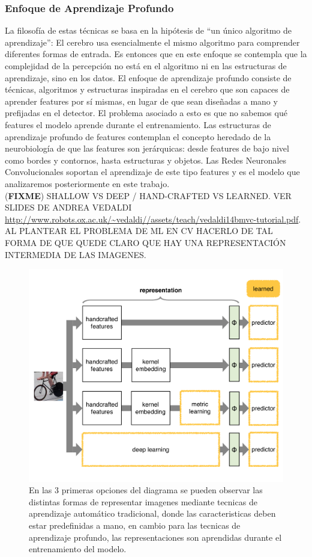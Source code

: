\documentclass[a4paper,11pt,spanish]{book}
\newcommand*{\FIXME}[1]{{(\textbf{FIXME}) {#1}}}
\begin{document}
	\subsubsection{Enfoque de Aprendizaje Profundo} 
	  La filosofía de estas técnicas se basa en la hipótesis de “un único algoritmo de aprendizaje”: El cerebro usa esencialmente el mismo algoritmo para comprender diferentes formas de entrada. 
	  Es entonces que en este enfoque se contempla que la complejidad de la percepción no está en el algoritmo ni en las estructuras de aprendizaje, sino en los datos. 
	  El enfoque de aprendizaje profundo consiste de técnicas, algoritmos y estructuras inspiradas en el cerebro que son capaces de aprender features por sí mismas, 
	  en lugar de que sean diseñadas a mano y prefijadas en el detector. El problema asociado a esto es que no sabemos qué features el modelo aprende durante el entrenamiento.
	  Las estructuras de aprendizaje profundo de features contemplan el concepto heredado de la neurobiología de que las features son jerárquicas: 
	  desde features de bajo nivel como bordes y contornos, hasta estructuras y objetos. Las Redes Neuronales Convolucionales soportan el aprendizaje de este tipo features 
	  y es el modelo que analizaremos posteriormente en este trabajo.\\
	 \FIXME{SHALLOW VS DEEP / HAND-CRAFTED VS LEARNED. VER SLIDES DE ANDREA VEDALDI
            \url{http://www.robots.ox.ac.uk/~vedaldi//assets/teach/vedaldi14bmvc-tutorial.pdf}.
            AL PLANTEAR EL PROBLEMA DE ML EN CV HACERLO DE TAL FORMA DE QUE QUEDE CLARO QUE HAY UNA REPRESENTACIÓN INTERMEDIA DE LAS IMAGENES.}
	  \begin{figure}[h]
	    \includegraphics[scale=0.5]{./img/vedaldi_shallow_deep.pdf}
	    \caption{En las 3 primeras opciones del diagrama se pueden observar las distintas formas de representar imagenes mediante tecnicas de aprendizaje automático tradicional,
	    donde las caracteristicas deben estar predefinidas a mano, en cambio para las tecnicas de aprendizaje profundo, las representaciones son aprendidas durante el entrenamiento
	    del modelo.}
	    \label{fig:figure2}
	  \end{figure}
       
\end{document}

